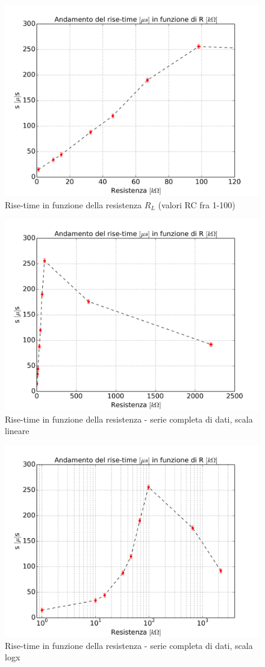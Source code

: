 \documentclass[journal, a4paper]{IEEEtran}
\begin{document}
\begin{figure}
\centering
\includegraphics[width=0.8\linewidth]{./rise_time_1-100}
\caption{Rise-time in funzione della resistenza $R_L$ (valori RC fra 1-100)}
\label{fig:rise_time_1-100}
\end{figure}

\begin{figure}
\centering
\includegraphics[width=0.8\linewidth]{./rise_time_all}
\caption{Rise-time in funzione della resistenza - serie completa di dati, scala lineare}
\label{fig:rise_time_all}
\end{figure}

\begin{figure}
\centering
\includegraphics[width=0.8\linewidth]{./rise_time_all_logx}
\caption{Rise-time in funzione della resistenza - serie completa di dati, scala logx}
\label{fig:rise_time_all_logx}
\end{figure}
\end{document}
